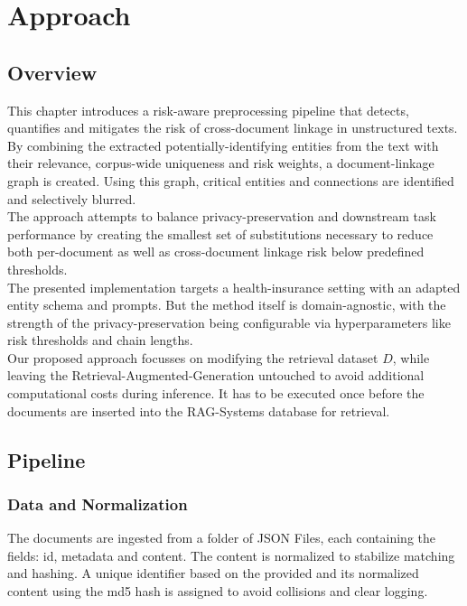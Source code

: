 \chapter{Approach}\label{chapter:approach}
\section{Overview}
This chapter introduces a risk-aware preprocessing pipeline that detects, quantifies and mitigates the risk of cross-document linkage in unstructured texts. By combining the extracted potentially-identifying entities from the text with their relevance, corpus-wide uniqueness and risk weights, a document-linkage graph is created. Using this graph, critical entities and connections are identified and selectively blurred.\\The approach attempts to balance privacy-preservation and downstream task performance by creating the smallest set of substitutions necessary to reduce both per-document as well as cross-document linkage risk below predefined thresholds. \\
The presented implementation targets a health-insurance setting with an adapted entity schema and prompts. But the method itself is domain-agnostic, with the strength of the privacy-preservation being configurable via hyperparameters like risk thresholds and chain lengths.\\
Our proposed approach focusses on modifying the retrieval dataset $D$, while leaving the Retrieval-Augmented-Generation untouched to avoid additional computational costs during inference. It has to be executed once before the documents are inserted into the RAG-Systems database for retrieval.



\section{Pipeline}
\subsection{Data and Normalization}
The documents are ingested from a folder of JSON Files, each containing the fields: id, metadata and content. The content is normalized to stabilize matching and hashing. A unique identifier based on the provided and its normalized content using the md5 hash is assigned to avoid collisions and clear logging.

